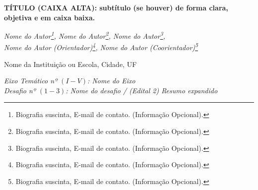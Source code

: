 \documentclass[12pt]{article}
\begin{document}
	
\begin{center}
\textbf{\Large TÍTULO (CAIXA ALTA): subtítulo (se houver) de forma clara, objetiva e em caixa baixa.}
\end{center}	

\begin{center}
\textit{	
	Nome do Autor\footnote{Biografia suscinta, E-mail de contato. (Informação Opcional).}, 
	Nome do Autor\footnote{Biografia suscinta, E-mail de contato. (Informação Opcional).}, 
	Nome do Autor\footnote{Biografia suscinta, E-mail de contato. (Informação Opcional).}, \\
	Nome do Autor  (Orientador)\footnote{Biografia suscinta, E-mail de contato. (Informação Opcional).}, 
	Nome do Autor  (Coorientador)\footnote{Biografia suscinta, E-mail de contato. (Informação Opcional).}
}
\end{center}

\begin{center}
	Nome da Instituição ou Escola, Cidade, UF
\end{center}


\begin{center}
\textit{	Eixo Temático  nº $(I - V)$: Nome do Eixo\\
		Desafio nº $(1 - 3)$: Nome do desafio  / (Edital 2) Resumo expandido}
\end{center}
\end{document}
